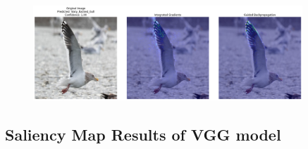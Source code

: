 \documentclass[a4paper,12pt]{report}
\begin{document}
\begin{figure}[H]
    \centering
    \includegraphics[width=0.9\textwidth]{images/appendix/vggcombined/download11.png}
\end{figure}


\subsection{Saliency Map Results of VGG model}
\end{document}
